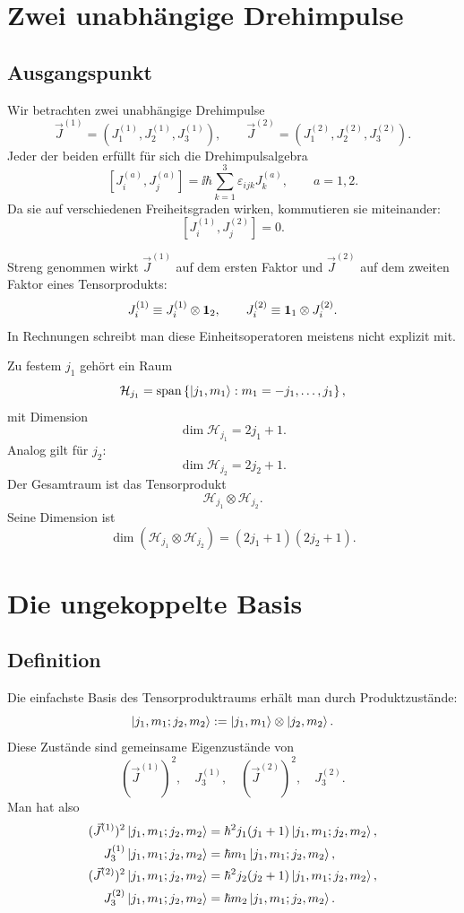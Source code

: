 \section{Zwei unabhängige Drehimpulse}

\subsection{Ausgangspunkt}

Wir betrachten zwei unabhängige Drehimpulse
\[
    \vec J^{(1)}=(J^{(1)}_1,J^{(1)}_2,J^{(1)}_3),
    \qquad
    \vec J^{(2)}=(J^{(2)}_1,J^{(2)}_2,J^{(2)}_3).
\]
Jeder der beiden erfüllt für sich die Drehimpulsalgebra
\[
    [J^{(a)}_i,J^{(a)}_j]
    =\ii\hbar\sum_{k=1}^3 \varepsilon_{ijk}J^{(a)}_k,
    \qquad a=1,2.
\]
Da sie auf verschiedenen Freiheitsgraden wirken, kommutieren sie miteinander:
\[
    [J^{(1)}_i,J^{(2)}_j]=0.
\]

\begin{notebox}
Streng genommen wirkt \(\vec J^{(1)}\) auf dem ersten Faktor und \(\vec J^{(2)}\) auf dem zweiten Faktor eines Tensorprodukts:
\[
    J^{(1)}_i \equiv J^{(1)}_i\otimes \mathbf{1}_2,
    \qquad
    J^{(2)}_i \equiv \mathbf{1}_1\otimes J^{(2)}_i.
\]
In Rechnungen schreibt man diese Einheitsoperatoren meistens nicht explizit mit.
\end{notebox}

Zu festem \(j_1\) gehört ein Raum
\[
    \mathcal H_{j_1}=\operatorname{span}\left\{ \left|j_1,m_1\right\rangle:m_1=-j_1,\dots,j_1 \right\},
\]
mit Dimension
\[
    \dim \mathcal H_{j_1}=2j_1+1.
\]
Analog gilt für \(j_2\):
\[
    \dim \mathcal H_{j_2}=2j_2+1.
\]
Der Gesamtraum ist das Tensorprodukt
\[
    \mathcal H_{j_1}\otimes \mathcal H_{j_2}.
\]
Seine Dimension ist
\[
    \dim(\mathcal H_{j_1}\otimes \mathcal H_{j_2})=(2j_1+1)(2j_2+1).
\]

\section{Die ungekoppelte Basis}

\subsection{Definition}

Die einfachste Basis des Tensorproduktraums erhält man durch Produktzustände:
\[
    \left|j_1,m_1;j_2,m_2\right\rangle
    := \left|j_1,m_1\right\rangle\otimes \left|j_2,m_2\right\rangle.
\]
Diese Zustände sind gemeinsame Eigenzustände von
\[
    (\vec J^{(1)})^2,
    \quad J^{(1)}_3,
    \quad (\vec J^{(2)})^2,
    \quad J^{(2)}_3.
\]
Man hat also
\begin{align*}
    (\vec J^{(1)})^2\left|j_1,m_1;j_2,m_2\right\rangle
    &=\hbar^2 j_1(j_1+1)\left|j_1,m_1;j_2,m_2\right\rangle,\\
    J^{(1)}_3\left|j_1,m_1;j_2,m_2\right\rangle
    &=\hbar m_1\left|j_1,m_1;j_2,m_2\right\rangle,\\
    (\vec J^{(2)})^2\left|j_1,m_1;j_2,m_2\right\rangle
    &=\hbar^2 j_2(j_2+1)\left|j_1,m_1;j_2,m_2\right\rangle,\\
    J^{(2)}_3\left|j_1,m_1;j_2,m_2\right\rangle
    &=\hbar m_2\left|j_1,m_1;j_2,m_2\right\rangle.
\end{align*}

